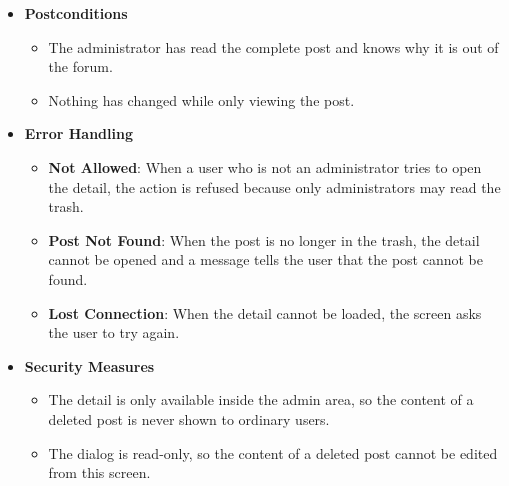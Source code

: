 \begin{itemize}[leftmargin=1.6em,topsep=4pt,itemsep=3pt,parsep=0pt,label=$\bullet$]
\begin{itemize}[leftmargin=2.2em,topsep=2pt,itemsep=3pt,parsep=0pt,label=$\circ$]
            \item \textbf{No Score}: When the automatic check produced no score, the badge shows ``N/A'' and the rest of the dialog is unchanged.
            \item \textbf{Rejected Post}: When the post was rejected during moderation, the dialog shows the Rejected badge and the line ``In trash (rejected)''.
        \end{itemize}
    \item \textbf{Postconditions}
        \begin{itemize}[leftmargin=2.2em,topsep=2pt,itemsep=3pt,parsep=0pt,label=$\circ$]
            \item The administrator has read the complete post and knows why it is out of the forum.
            \item Nothing has changed while only viewing the post.
        \end{itemize}
    \item \textbf{Error Handling}
        \begin{itemize}[leftmargin=2.2em,topsep=2pt,itemsep=3pt,parsep=0pt,label=$\circ$]
            \item \textbf{Not Allowed}: When a user who is not an administrator tries to open the detail, the action is refused because only administrators may read the trash.
            \item \textbf{Post Not Found}: When the post is no longer in the trash, the detail cannot be opened and a message tells the user that the post cannot be found.
            \item \textbf{Lost Connection}: When the detail cannot be loaded, the screen asks the user to try again.
        \end{itemize}
    \item \textbf{Security Measures}
        \begin{itemize}[leftmargin=2.2em,topsep=2pt,itemsep=3pt,parsep=0pt,label=$\circ$]
            \item The detail is only available inside the admin area, so the content of a deleted post is never shown to ordinary users.
            \item The dialog is read-only, so the content of a deleted post cannot be edited from this screen.
        \end{itemize}
\end{itemize}


